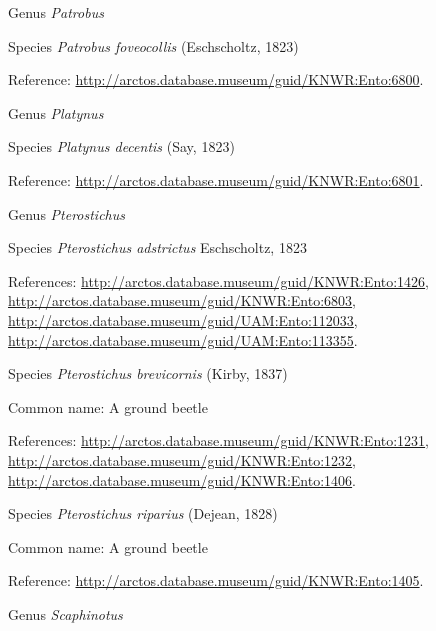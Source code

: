 \documentclass[9pt, article]{memoir}
\begin{document}
\begin{multicols}{2}
\vspace{6pt}\noindent\hspace{30pt}Genus \textit{Patrobus}


\vspace{6pt}\noindent\hspace{36pt}Species \textit{Patrobus foveocollis} (Eschscholtz, 1823)


Reference: 
\url{http://arctos.database.museum/guid/KNWR:Ento:6800}.

\vspace{6pt}\noindent\hspace{30pt}Genus \textit{Platynus}


\vspace{6pt}\noindent\hspace{36pt}Species \textit{Platynus decentis} (Say, 1823)


Reference: 
\url{http://arctos.database.museum/guid/KNWR:Ento:6801}.

\vspace{6pt}\noindent\hspace{30pt}Genus \textit{Pterostichus}


\vspace{6pt}\noindent\hspace{36pt}Species \textit{Pterostichus adstrictus} Eschscholtz, 1823


References: 
\url{http://arctos.database.museum/guid/KNWR:Ento:1426}, 
\url{http://arctos.database.museum/guid/KNWR:Ento:6803}, 
\url{http://arctos.database.museum/guid/UAM:Ento:112033}, 
\url{http://arctos.database.museum/guid/UAM:Ento:113355}.

\vspace{6pt}\noindent\hspace{36pt}Species \textit{Pterostichus brevicornis} (Kirby, 1837)


Common name: A ground beetle

References: 
\url{http://arctos.database.museum/guid/KNWR:Ento:1231}, 
\url{http://arctos.database.museum/guid/KNWR:Ento:1232}, 
\url{http://arctos.database.museum/guid/KNWR:Ento:1406}.

\vspace{6pt}\noindent\hspace{36pt}Species \textit{Pterostichus riparius} (Dejean, 1828)


Common name: A ground beetle

Reference: 
\url{http://arctos.database.museum/guid/KNWR:Ento:1405}.

\vspace{6pt}\noindent\hspace{30pt}Genus \textit{Scaphinotus}



\end{multicols}
\end{document}
